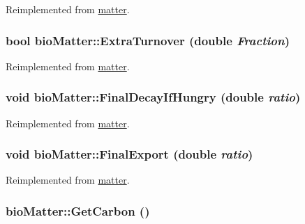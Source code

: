 Reimplemented from \hyperlink{classmatter_a2c4adc457cfb867ea5abd7e8a3489c48}{matter}.\hypertarget{classbio_matter_aaa093e840d976d780d9601562709c044}{
\subsubsection[{ExtraTurnover}]{\setlength{\rightskip}{0pt plus 5cm}bool bioMatter::ExtraTurnover (double {\em Fraction})}}
\label{classbio_matter_aaa093e840d976d780d9601562709c044}


Reimplemented from \hyperlink{classmatter_a3e3b834e7187ad3447eda29a2703377a}{matter}.\hypertarget{classbio_matter_adbafa5aac0c673f8659adec82a4cc99f}{
\subsubsection[{FinalDecayIfHungry}]{\setlength{\rightskip}{0pt plus 5cm}void bioMatter::FinalDecayIfHungry (double {\em ratio})}}
\label{classbio_matter_adbafa5aac0c673f8659adec82a4cc99f}


Reimplemented from \hyperlink{classmatter_a5f04a9ddefede46fd82848148a5fbab8}{matter}.\hypertarget{classbio_matter_ae738d8197ededa18e73f8640ce52d1ab}{
\subsubsection[{FinalExport}]{\setlength{\rightskip}{0pt plus 5cm}void bioMatter::FinalExport (double {\em ratio})}}
\label{classbio_matter_ae738d8197ededa18e73f8640ce52d1ab}


Reimplemented from \hyperlink{classmatter_a36bd225841eda2240009df17d239cfa1}{matter}.\hypertarget{classbio_matter_a5e053f03d4be2b04f8e5f633f4181af1}{
\subsubsection[{GetCarbon}]{ bioMatter::GetCarbon ()}}
\label{classbio_matter_a5e053f03d4be2b04f8e5f633f4181af1}


